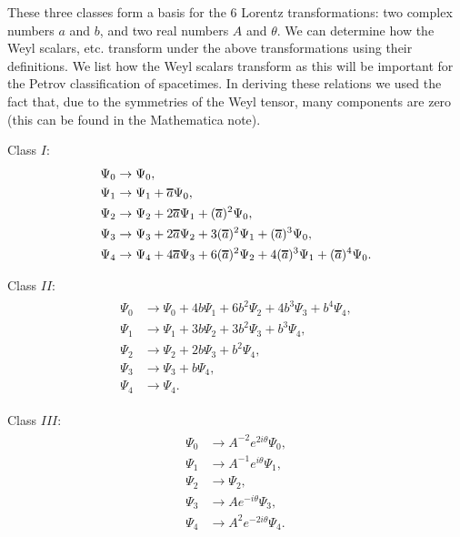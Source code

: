 \documentclass[12pt]{report}
\newcommand*\oline[1]{%
   \vbox{%
     \hrule height 1pt%
     \kern0.25ex%
     \hbox{%
       \ifmmode#1\else\ensuremath{#1}\fi%
     }
   }
}
\begin{document}
	These three classes form a basis for the 6 Lorentz transformations:
two complex numbers $a$ and $b$, and two real numbers $A$ and $\theta$. We
can determine how the Weyl scalars, etc. transform under the above
transformations using their definitions. We list how the Weyl scalars
transform as this will be important for the Petrov classification of
spacetimes. In deriving these relations we used the fact that, due
to the symmetries of the Weyl tensor, many components are zero (this
can be found in the Mathematica note).

	Class $I$:
\begin{align}
\begin{aligned}
\label{eq:null_frame_transformations_class_one_Weyl_scalars}
	\Psi_0 & \to \Psi_0 , \\
	\Psi_1 & \to \Psi_1 + \oline{a} \Psi_0 , \\
	\Psi_2 & \to \Psi_2 + 2\oline{a}\Psi_1 + (\oline{a})^2\Psi_0 , \\ 
	\Psi_3 & \to \Psi_3 + 2\oline{a}\Psi_2 + 3(\oline{a})^2\Psi_1 + (\oline{a})^3\Psi_0 , \\
	\Psi_4 & \to \Psi_4 + 4\oline{a}\Psi_3 + 6(\oline{a})^2\Psi_2 + 4(\oline{a})^3\Psi_1 + (\oline{a})^4\Psi_0 
	.
\end{aligned}
\end{align}

	Class $II$:
\begin{align}
\begin{aligned}
\label{eq:null_frame_transformations_class_two_Weyl_scalars}
	\Psi_0 & \to \Psi_0 + 4b\Psi_1 + 6b^2\Psi_2 + 4b^3\Psi_3 + b^4\Psi_4 , \\
	\Psi_1 & \to \Psi_1 + 3b\Psi_2 + 3b^2\Psi_3 + b^3\Psi_4 , \\
	\Psi_2 & \to \Psi_2 + 2b\Psi_3 + b^2\Psi_4 , \\ 
	\Psi_3 & \to \Psi_3 + b\Psi_4 , \\
	\Psi_4 & \to \Psi_4
	.
\end{aligned}
\end{align}

	Class $III$:
\begin{align}
\begin{aligned}
\label{eq:null_frame_transformations_class_three_Weyl_scalars}
	\Psi_0 & \to A^{-2}e^{2i\theta}\Psi_0 , \\
	\Psi_1 & \to A^{-1}e^{i\theta}\Psi_1 , \\
	\Psi_2 & \to \Psi_2 , \\ 
	\Psi_3 & \to A e^{-i\theta}\Psi_3 , \\
	\Psi_4 & \to A^2 e^{-2i\theta}\Psi_4
	.
\end{aligned}
\end{align}
\end{document}
